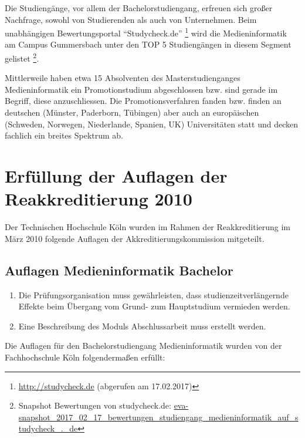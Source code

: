 Die Studiengänge, vor allem der Bachelorstudiengang, erfreuen sich
großer Nachfrage, sowohl von Studierenden als auch von Unternehmen. Beim
unabhängigen Bewertungsportal ``Studycheck.de'' \footnote{\url{http://studycheck.de}
  (abgerufen am 17.02.2017)} wird die Medieninformatik am Campus
Gummersbach unter den TOP 5 Studiengängen in diesem Segment gelistet
\footnote{Snapshot Bewertungen von studycheck.de:
  \href{https://th-koeln.github.io/mi-2017/anhaenge/eva-snapshot_2017_02_17_bewertungen_studiengang_medieninformatik_auf_studycheck_._de}{eva-snapshot\_2017\_02\_17\_bewertungen\_studiengang\_medieninformatik\_auf\_studycheck\_.\_de}}.

Mittlerweile haben etwa 15 Absolventen des Masterstudienganges
Medieninformatik ein Promotionstudium abgeschlossen bzw. sind gerade im
Begriff, diese anzuschliessen. Die Promotionsverfahren fanden bzw.
finden an deutschen (Münster, Paderborn, Tübingen) aber auch an
europäischen (Schweden, Norwegen, Niederlande, Spanien, UK)
Universitäten statt und decken fachlich ein breites Spektrum ab.

\section{Erfüllung der Auflagen der Reakkreditierung
2010}\label{erfuxfcllung-der-auflagen-der-reakkreditierung-2010}

Der Technischen Hochschule Köln wurden im Rahmen der Reakkreditierung im
März 2010 folgende Auflagen der Akkreditierungskommission mitgeteilt.

\subsection{Auflagen Medieninformatik
Bachelor}\label{auflagen-medieninformatik-bachelor}

\begin{siderules}
\begin{enumerate}
\def\labelenumi{\arabic{enumi}.}
\tightlist
\item
  Die Prüfungsorganisation muss gewährleisten, dass
  studienzeitverlängernde Effekte beim Übergang vom Grund- zum
  Hauptstudium vermieden werden.
\item
  Eine Beschreibung des Moduls Abschlussarbeit muss erstellt werden.
\end{enumerate}
\end{siderules}

Die Auflagen für den Bachelorstudiengang Medieninformatik wurden von der
Fachhochschule Köln folgendermaßen erfüllt:

